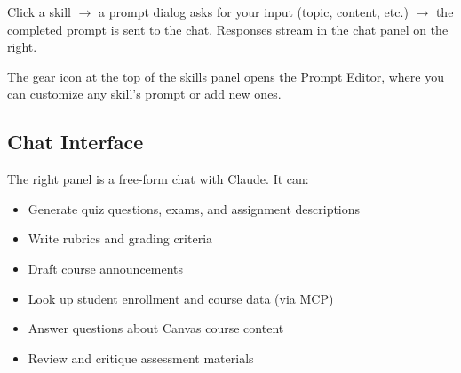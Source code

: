\documentclass[12pt,letterpaper]{article}
\begin{document}
\begin{center}
\end{center}

Click a skill $\to$ a prompt dialog asks for your input (topic, content, etc.) $\to$ the completed prompt is sent to the chat. Responses stream in the chat panel on the right.

The gear icon at the top of the skills panel opens the Prompt Editor, where you can customize any skill's prompt or add new ones.

\subsection{Chat Interface}

The right panel is a free-form chat with Claude. It can:

\begin{itemize}[leftmargin=*]
    \item Generate quiz questions, exams, and assignment descriptions
    \item Write rubrics and grading criteria
    \item Draft course announcements
    \item Look up student enrollment and course data (via MCP)
    \item Answer questions about Canvas course content
    \item Review and critique assessment materials
\end{itemize}
\end{document}
